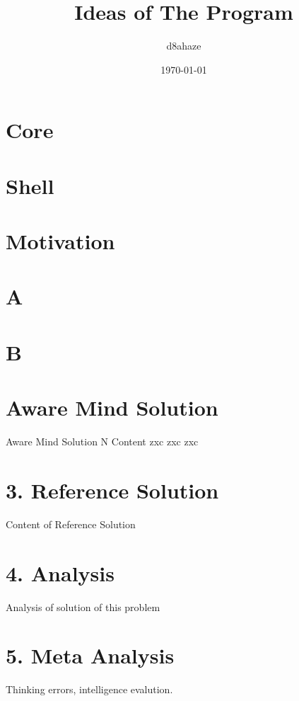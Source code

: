 \documentclass{spaceA}
\author{d8ahaze}
\date{\today}
\title{Ideas of The Program}
\begin{document}
 \maketitle

\asec

\section{Core} 

\section{Shell}

\section{Motivation}


\vspace{5mm}
\asec

\section{A}

\section{B}

\section{Aware Mind Solution} Aware Mind Solution N Content zxc zxc zxc

\section{3. Reference Solution} Content of Reference Solution

\section{4. Analysis} Analysis of solution of this problem

\section{5. Meta Analysis} Thinking errors, intelligence evalution.
\end{document}
